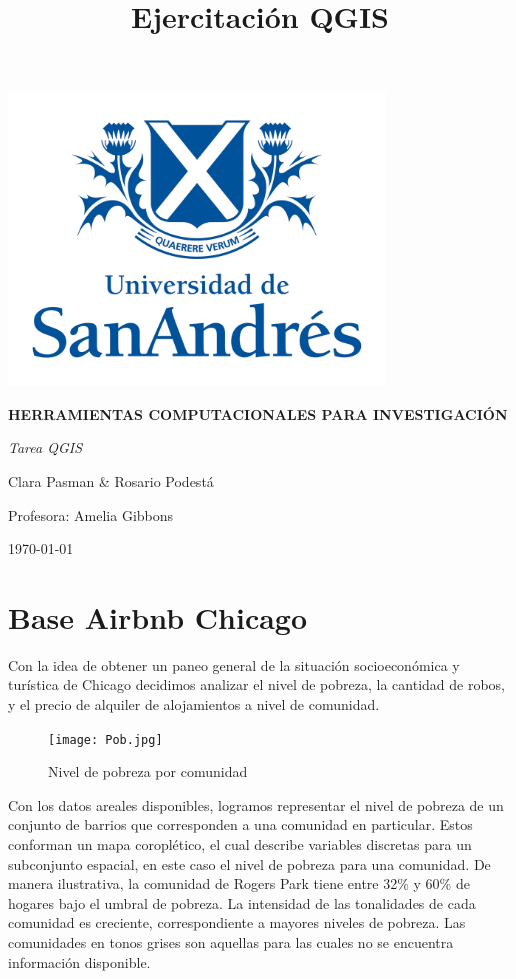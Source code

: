 \documentclass[11pt, spanish]{article}
\begin{document}
\title{Ejercitación QGIS}


\thispagestyle{empty}
\begin{center}
	\includegraphics[width=10cm]{Universidad_San_Andres_UdeSA.jpg}
		
\end{center}
	
	\begin{center}
	\LARGE
\textbf{HERRAMIENTAS COMPUTACIONALES PARA INVESTIGACIÓN}
	

	\vspace{2cm}
	\LARGE
	\textit{Tarea QGIS}

	\vspace{2cm}
	\Large
	Clara Pasman \& Rosario Podestá\
	
	\vspace{1.3cm}
	\Large	
	Profesora: Amelia Gibbons\

	
	\vspace{1.3cm}
	\normalsize
	\today
	\end{center}
	
\clearpage
\section{Base Airbnb Chicago}
\indent Con la idea de obtener un paneo general de la situación socioeconómica y turística de Chicago decidimos analizar el nivel de pobreza, la cantidad de robos, y el precio de alquiler de alojamientos a nivel de comunidad. 


\begin{figure}[hbtp]
\caption{Nivel de pobreza por comunidad}
\centering
\texttt{[image: Pob.jpg]}
\end{figure}

\indent Con los datos areales disponibles, logramos representar el nivel de pobreza de un conjunto de barrios que corresponden a una comunidad en particular. Estos conforman un mapa coroplético, el cual describe variables discretas para un subconjunto espacial, en este caso el nivel de pobreza para una comunidad. De manera ilustrativa, la comunidad de Rogers Park tiene entre 32\% y 60\% de hogares bajo el umbral de pobreza. La intensidad de las tonalidades de cada comunidad es creciente, correspondiente a mayores niveles de pobreza. Las comunidades en tonos grises son aquellas para las cuales no se encuentra información disponible.\\ 
\end{document}
